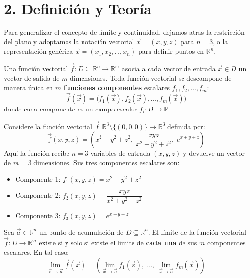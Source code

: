 \documentclass[11pt]{article}
\newenvironment{teoria}{%
  \section*{2. Definición y Teoría}%
}{}
\newenvironment{definicion}[1]{%
  \begin{tcolorbox}[colback=blue!5,colframe=blue!75!black,title=Definición: #1]%
}{%
  \end{tcolorbox}%
}
\newenvironment{teorema}[1]{%
  \begin{tcolorbox}[colback=green!5,colframe=green!75!black,title=Teorema: #1]%
}{%
  \end{tcolorbox}%
}
\newenvironment{ejemplo}[1]{%
  \begin{tcolorbox}[colback=white,colframe=gray!40,title=Ejemplo: #1]%
}{%
  \end{tcolorbox}%
}
\begin{document}
\begin{teoria}
  Para generalizar el concepto de límite y continuidad, dejamos atrás la restricción del plano y adoptamos la notación vectorial $\vec{x} = (x,y,z)$ para $n=3$, o la representación genérica $\vec{x} = (x_1, x_2, \dots, x_n)$ para definir puntos en $\mathbb{R}^n$.

  \begin{definicion}{Función Vectorial de Varias Variables}
    Una función vectorial $\vec{f} \colon D \subseteq \mathbb{R}^n \to \mathbb{R}^m$ asocia a cada vector de entrada $\vec{x} \in D$ un vector de salida de $m$ dimensiones. Toda función vectorial se descompone de manera única en $m$ \textbf{funciones componentes} escalares $f_1, f_2, \dots, f_m$:
    $$ \vec{f}(\vec{x}) = \Big( f_1(\vec{x}), f_2(\vec{x}), \dots, f_m(\vec{x}) \Big) $$
    donde cada componente es un campo escalar $f_i \colon D \to \mathbb{R}$.
  \end{definicion}

  \begin{ejemplo}{Anatomía de un Campo Vectorial en $\mathbb{R}^3$}
    Considere la función vectorial $\vec{f} \colon \mathbb{R}^3 \setminus \{(0,0,0)\} \to \mathbb{R}^3$ definida por:
    $$ \vec{f}(x,y,z) = \left( x^2 + y^2 + z^2, \; \displaystyle \dfrac{xyz}{x^2 + y^2 + z^2}, \; e^{x+y+z} \right) $$
    Aquí la función recibe $n=3$ variables de entrada $(x,y,z)$ y devuelve un vector de $m=3$ dimensiones. Sus tres componentes escalares son:
    \begin{itemize}
      \item Componente 1: $f_1(x,y,z) = x^2 + y^2 + z^2$
      \item Componente 2: $f_2(x,y,z) = \displaystyle \dfrac{xyz}{x^2 + y^2 + z^2}$
      \item Componente 3: $f_3(x,y,z) = e^{x+y+z}$
    \end{itemize}
  \end{ejemplo}

  \begin{teorema}{Límite y Continuidad por Componentes en $\mathbb{R}^n$}
    Sea $\vec{a} \in \mathbb{R}^n$ un punto de acumulación de $D \subseteq \mathbb{R}^n$. El límite de la función vectorial $\vec{f} \colon D \to \mathbb{R}^m$ existe si y solo si existe el límite de \textbf{cada una} de sus $m$ componentes escalares. En tal caso:
    $$ \displaystyle \lim\limits_{\vec{x} \to \vec{a}} \vec{f}(\vec{x}) = \left( \displaystyle \lim\limits_{\vec{x} \to \vec{a}} f_1(\vec{x}), \; \dots, \; \displaystyle \lim\limits_{\vec{x} \to \vec{a}} f_m(\vec{x}) \right) $$
    

\end{teorema}
\end{teoria}
\end{document}
